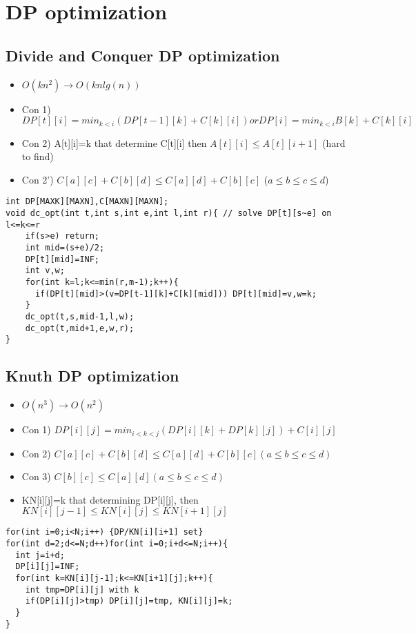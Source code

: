 \documentclass[landscape, 8pt, a4paper, oneside, twocolumn]{extarticle}
\begin{document}
\section{DP optimization}

\subsection{Divide and Conquer DP optimization}
\begin{itemize}
    \item $O( k n ^ {2} ) \to O( k n lg(n) )$
    \item Con 1) $ DP[t][i]=min_{k<i}(DP[t-1][k]+C[k][i]) or DP[i]=min_{k<i} B[k]+C[k][i] $
    \item Con 2) A[t][i]=k that determine C[t][i] then $ A[t][i] \leq A[t][i+1] $ (hard to find)
    \item Con 2') $ C[a][c]+C[b][d] \leq C[a][d]+C[b][c] $ ($ a \leq b \leq c \leq d $)
\end{itemize}
\begin{verbatim}
int DP[MAXK][MAXN],C[MAXN][MAXN];
void dc_opt(int t,int s,int e,int l,int r){ // solve DP[t][s~e] on l<=k<=r
    if(s>e) return;
    int mid=(s+e)/2;
    DP[t][mid]=INF;
    int v,w;
    for(int k=l;k<=min(r,m-1);k++){
      if(DP[t][mid]>(v=DP[t-1][k]+C[k][mid])) DP[t][mid]=v,w=k;
    }
    dc_opt(t,s,mid-1,l,w);
    dc_opt(t,mid+1,e,w,r);
}
\end{verbatim}

\subsection{Knuth DP optimization}
\begin{itemize}
    \item $O( n ^ {3} ) \to O( n ^ { 2 } )$
    \item Con 1) $ DP[i][j]=min_{i<k<j}(DP[i][k]+DP[k][j])+C[i][j] $
    \item Con 2) $ C[a][c]+C[b][d]\leq C[a][d]+C[b][c] (a\leq b \leq c \leq d) $
    \item Con 3) $ C[b][c] \leq C[a][d] (a \leq b \leq c \leq d) $
    \item KN[i][j]=k that determining DP[i][j], then $ KN[i][j-1] \leq KN[i][j] \leq KN[i+1][j] $
\end{itemize}
\begin{verbatim}
for(int i=0;i<N;i++) {DP/KN[i][i+1] set}
for(int d=2;d<=N;d++)for(int i=0;i+d<=N;i++){
  int j=i+d;
  DP[i][j]=INF;
  for(int k=KN[i][j-1];k<=KN[i+1][j];k++){
    int tmp=DP[i][j] with k
    if(DP[i][j]>tmp) DP[i][j]=tmp, KN[i][j]=k;
  }
}
\end{verbatim}
\end{document}
